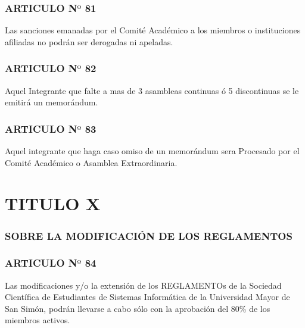 \documentclass[letterpaper,11pt]{book}
\begin{document}
\subsubsection*{ARTICULO N$º$ 81} 
Las sanciones emanadas por el Comité Académico a los miembros o instituciones afiliadas no podrán ser derogadas ni apeladas.
\subsubsection*{ARTICULO N$º$ 82} 
Aquel Integrante que falte a mas de 3 asambleas continuas ó 5 discontinuas se le emitirá un memorándum.
\subsubsection*{ARTICULO N$º$ 83} 
Aquel integrante que  haga caso omiso de un memorándum sera Procesado por el Comité Académico o Asamblea Extraordinaria.
\section*{TITULO X}
\subsubsection*{SOBRE LA MODIFICACIÓN DE LOS REGLAMENTOS}
\subsubsection*{ARTICULO N$º$ 84} 
Las modificaciones y/o la extensión de los REGLAMENTOs de la Sociedad Científica de Estudiantes de Sistemas Informática de la Universidad Mayor de San Simón, podrán llevarse a cabo sólo con la aprobación del 80\% de los miembros activos. 
\end{document}
